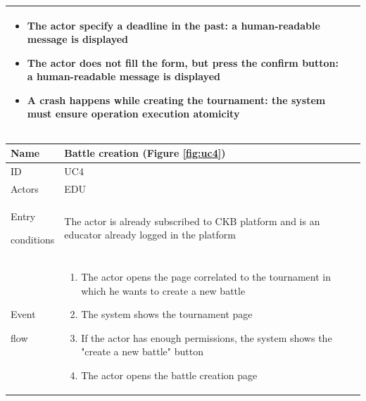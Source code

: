 \begin{center}
\begin{tabular}{| m{2cm} | m{10cm}|}
\begin{itemize}
                                    \item The actor specify a deadline in the past: a human-readable message is displayed
                                    \item The actor does not fill the form, but press the confirm button: a human-readable message is displayed
                                    \item {\color{red} A crash happens while creating the tournament: the system must ensure operation execution atomicity}
                                \end{itemize}                              \\ \hline
    \end{tabular}
\end{center}

\begin{center}
    \def\arraystretch{1.5}
    \begin{tabular}{| m{2cm} | m{10cm}|}
        \hline
        Name                  & Battle creation  (Figure \ref{fig:uc4})                                                                                         \\ \hline
        ID                    & UC4                                                                                                                             \\ \hline
        Actors                & EDU                                                                                                                             \\ \hline
        Entry \par conditions & The actor is already subscribed to CKB platform and is an educator already logged in the platform                        \\ \hline
        Event \par flow       & \begin{enumerate}
                                    \item The actor opens the page correlated to the tournament in which he wants to create a new battle
                                    \item The system shows the tournament page
                                    \item If the actor has enough permissions, the system shows the "create a new battle" button
                                    \item The actor opens the battle creation page

\end{enumerate}
\end{tabular}
\end{center}
